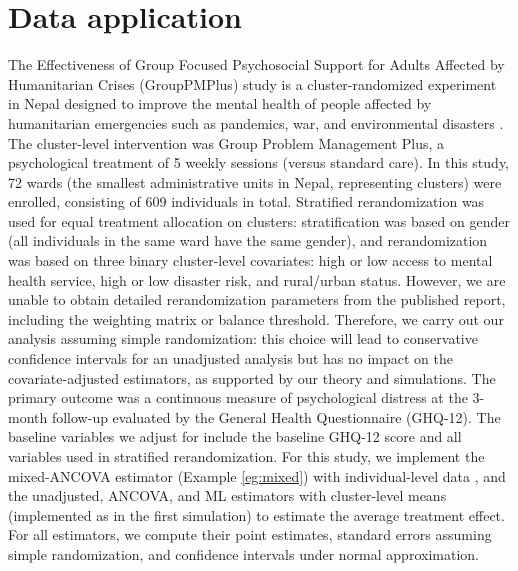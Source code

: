 \documentclass[12pt]{article}
\begin{document}
{\section{Data application}\label{sec:data}
The Effectiveness of Group Focused Psychosocial Support for Adults Affected by Humanitarian Crises (GroupPMPlus) study is a cluster-randomized experiment in Nepal designed to improve the mental health of people affected by humanitarian emergencies such as pandemics, war, and environmental disasters \citep{jordans2021effectiveness}. The cluster-level intervention was Group Problem Management Plus, a psychological treatment of 5 weekly sessions (versus standard care). %
In this study, 72 wards (the smallest administrative units in Nepal, representing clusters) were enrolled, consisting of 609 individuals in total. Stratified rerandomization was used for equal treatment allocation on clusters: stratification was based on gender (all individuals in the same ward have the same gender), and rerandomization was based on three binary cluster-level covariates: high or low access to mental health service, high or low disaster risk, and rural/urban status. However, we are unable to obtain detailed rerandomization parameters from the published report, including the weighting matrix or balance threshold. Therefore, we carry out our analysis assuming simple randomization: this choice will lead to conservative confidence intervals for an unadjusted analysis but has no impact on the covariate-adjusted estimators, as supported by our theory and simulations. 
The primary outcome was a continuous measure of psychological distress at the 3-month follow-up evaluated by the General Health Questionnaire (GHQ-12). The baseline variables we adjust for include the baseline GHQ-12 score and all variables used in stratified rerandomization. For this study, we implement the mixed-ANCOVA estimator (Example \ref{eg:mixed}) with individual-level data \citep{wang2021mixed}, and the unadjusted, ANCOVA, and ML estimators with cluster-level means (implemented as in the first simulation) to estimate the average treatment effect. For all estimators, we compute their point estimates, standard errors assuming simple randomization, and confidence intervals under normal approximation. 

}
\end{document}
